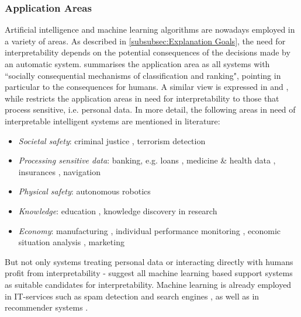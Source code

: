 \subsubsection{Application Areas}
Artificial intelligence and machine learning algorithms are nowadays employed in a variety of areas. As described in \ref{subsubsec:Explanation Goals}, the need for interpretability depends on the potential consequences of the decisions made by an automatic system. \cite{burrell2016machine} summarises the application area as all systems with ``socially consequential mechanisms of classification and ranking", pointing in particular to the consequences for humans. A similar view is expressed in \cite{poursabzi2017manipulating} and \cite{ribeiro2016should}, while \cite{guidotti2018survey} restricts the application areas in need for interpretability to those that process sensitive, i.e. personal data. In more detail, the following areas in need of interpretable intelligent systems are mentioned in literature:
\begin{itemize}
	\item \textit{Societal safety}: criminal justice \cite{chen2018learning, poursabzi2017manipulating}, terrorism detection \cite{ribeiro2016should}	
	\item \textit{Processing sensitive data}: banking, e.g. loans \cite{burrell2016machine, chen2018learning, domingos2012few, gilpin2018explaining, poursabzi2017manipulating}, medicine \& health data \cite{chen2018learning, goodman16eu, guidotti2018survey, poursabzi2017manipulating, ribeiro2016should, richardson2018survey, ventocilla2018taxonomy}, insurances \cite{burrell2016machine, domingos2012few, guidotti2018survey}, navigation \cite{goodman16eu}
	\item \textit{Physical safety}: autonomous robotics \cite{guidotti2018survey, richardson2018survey}
	\item \textit{Knowledge}: education \cite{ventocilla2018taxonomy}, knowledge discovery in research \cite{guidotti2018survey}	
	\item \textit{Economy}: manufacturing \cite{ventocilla2018taxonomy}, individual performance monitoring \cite{goodman16eu}, economic situation analysis \cite{goodman16eu}, marketing \cite{burrell2016machine, domingos2012few, gilpin2018explaining}
\end{itemize}
But not only systems treating personal data or interacting directly with humans profit from interpretability - \cite{ventocilla2018taxonomy} suggest all machine learning based support systems as suitable candidates for interpretability. Machine learning is already employed in IT-services such as spam detection and search engines \cite{burrell2016machine, domingos2012few}, as well as in recommender systems \cite{gilpin2018explaining, richardson2018survey}.\newline
